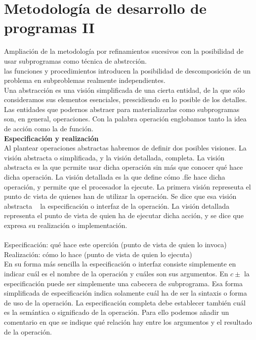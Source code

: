 \documentclass[11pt,a4paper]{article}
\begin{document}
  \section{Metodología de desarrollo de programas II}
  Ampliación de la metodología por refinamientos sucesivos con la posibilidad de usar subprogramas como técnica de abstrcción.\\
  las funciones y procedimientos introducen la posibilidad
  de descomposición de un problema en subproblemas realmente independientes.\\
  Una abstracción es una visión simplificada de una cierta entidad, de la que
  sólo consideramos sus elementos esenciales, prescidiendo en lo posible de los
  detalles. Las entidades que podernos abstraer para materializarlas como subprogramas
  son, en general, operaciones. Con la palabra operación englobamos
  tanto la idea de acción como la de función.\\
  \textbf{Especificación y realización}\\
  Al plantear operaciones abstractas habremos de definir dos posibles visiones.
  La visión abstracta o simplificada, y la visión detallada, completa. La visión
  abstracta es la que pcrmite usar dicha operación sin más que conocer qué
  hace dicha operación. La visión detallada es la que define cómo .fíe hace dicha
  operación, y permite que el procesador la ejecute. La primera visión represeuta
  el punto dc vista de quienes han de utilizar la operación. Se dice que esa visión
  abstracta ~ la especificación o interfaz de la operación. La visión detallada
  representa el punto de vista de quien ha de ejecutar dicha acción, y se dice
  que expresa su realización o implementación.\\
  \\
  Especificación: qué hace este operción (punto de vista de quien lo invoca)
  \\
  Realización: cómo lo hace (punto de vista de quien lo ejecuta) 
  \\ En su forma más sencilla la especificación o interfaz consiste simplemente en
  indicar cuál es el nombre de la operación y cuáles son sus argumentos. En $ c\pm $
  la especificación puede ser simplemente una cabecera de subprograma.
  Esa forma simplificada de especificación indica solamente cuál ha de ser la
  sintaxis o forma de uso de la operación. La especificación completa debe
  establecer también cuál es la semántica o significado de la operación. Para
  ello podemos añadir un comentario en que se indique qué relación hay entre
  los argumentos y el resultado de la operación.\\
\end{document}

